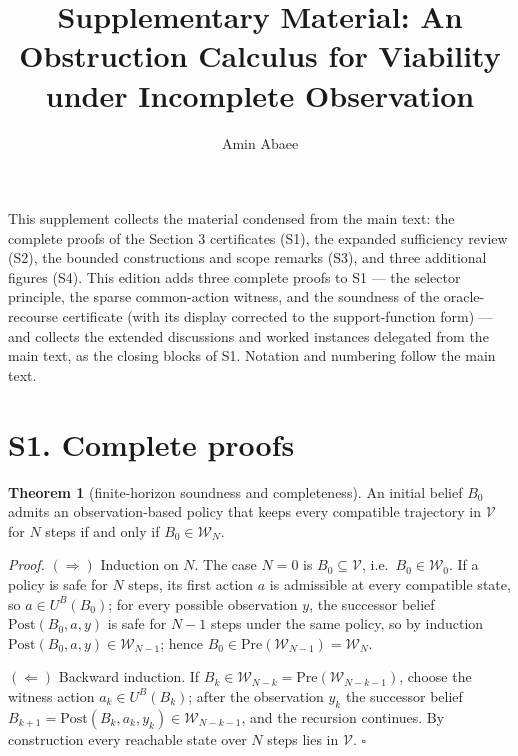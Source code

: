 \documentclass[11pt]{article}
\theoremstyle{definition}
\newtheorem{theorem}{Theorem}
\begin{document}
\title{Supplementary Material: An Obstruction Calculus for Viability under Incomplete Observation}
\author{Amin Abaee}
\maketitle

This supplement collects the material condensed from the main text: the complete proofs of the Section 3 certificates (S1), the expanded sufficiency review (S2), the bounded constructions and scope remarks (S3), and three additional figures (S4). This edition adds three complete proofs to S1 --- the selector principle, the sparse common-action witness, and the soundness of the oracle-recourse certificate (with its display corrected to the support-function form) --- and collects the extended discussions and worked instances delegated from the main text, as the closing blocks of S1. Notation and numbering follow the main text.

\section*{S1. Complete proofs}

\begin{theorem}[finite-horizon soundness and completeness]\label{thm:finite-horizon}
An initial belief \(B_0\) admits an observation-based policy that keeps
every compatible trajectory in \(\mathcal V\) for \(N\) steps if and only
if \(B_0\in\mathcal W_N\).
\end{theorem}

\emph{Proof.} \((\Rightarrow)\) Induction on \(N\). The case \(N=0\) is
\(B_0\subseteq\mathcal V\), i.e.\ \(B_0\in\mathcal W_0\). If a policy is
safe for \(N\) steps, its first action \(a\) is admissible at every
compatible state, so \(a\in U^B(B_0)\); for every possible observation
\(y\), the successor belief \(\mathrm{Post}(B_0,a,y)\) is safe for \(N-1\)
steps under the same policy, so by induction
\(\mathrm{Post}(B_0,a,y)\in\mathcal W_{N-1}\); hence
\(B_0\in\mathrm{Pre}(\mathcal W_{N-1})=\mathcal W_N\).

\((\Leftarrow)\) Backward induction. If \(B_k\in\mathcal W_{N-k} =
\mathrm{Pre}(\mathcal W_{N-k-1})\), choose the witness action
\(a_k\in U^B(B_k)\); after the observation \(y_k\) the successor belief
\(B_{k+1}=\mathrm{Post}(B_k,a_k,y_k)\in\mathcal W_{N-k-1}\), and the
recursion continues. By construction every reachable state over \(N\)
steps lies in \(\mathcal V\). \ensuremath{\square}
\end{document}
